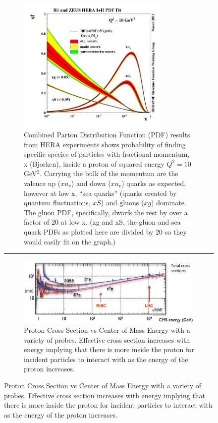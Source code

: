 \begin{figure}
\centering
\begin{subfigure}[p]{0.8\textwidth}
  \centering
    \includegraphics[width=0.8\textwidth]{prevplots/herapdf15f_alpha.png}
  \caption[H1 and ZEUS Parton Distribution Functions]{Combined Parton Distribution Function (PDF) results from HERA experiments\citep{Abramowicz2015} shows probability of finding specific species of particles with fractional momentum, x (Bjorken), inside a proton of squared energy $Q^2 = 10$ GeV$^2$. Carrying the bulk of the momentum are the valence up ($xu_v$) and down ($xu_v$) quarks as expected, however at low x, ``sea quarks'' (quarks created by quantum fluctuations, $xS$) and gluons ($xg$) dominate. The gluon PDF, specifically, dwarfs the rest by over a factor of 20 at low x. (xg and xS, the gluon and sea quark PDFs as plotted here are divided by 20 so they would easily fit on the graph.)}
  \label{fig:HERAPDF}
\end{subfigure}
    \rule{35em}{0.5pt}
\begin{subfigure}[p]{0.8\textwidth}
  \centering
    \includegraphics[width=1\textwidth]{prevplots/protoncrosssection.JPG}
  \caption[Proton Cross Section vs Center of Mass Energy.]{Proton Cross Section vs Center of Mass Energy with a variety of probes\citep{PDGcrosssection}\citep{Itakura2012}. Effective cross section increases with energy implying that there is more inside the proton for incident particles to interact with as the energy of the proton increases.}
  \label{fig:PDGxsection}
\end{subfigure}
\end{figure}

